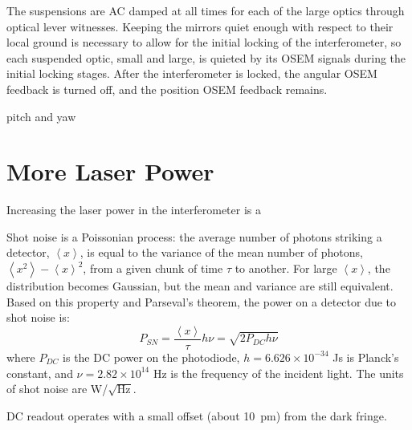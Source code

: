 The suspensions are AC damped at all times for each of the large
optics through optical lever witnesses. Keeping the mirrors quiet
enough with respect to their local ground is necessary to allow for
the initial locking of the interferometer, so each suspended optic,
small and large, is quieted by its OSEM signals during the initial
locking stages. After the interferometer is locked, the angular OSEM
feedback is turned off, and the position OSEM feedback remains.

pitch and yaw



\section{More Laser Power}
Increasing the laser power in the interferometer is a 

Shot noise is a Poissonian process: the average number of photons
striking a detector, $\left<x\right>$, is equal to the variance of the
mean number of photons, $\left<x^2\right> - \left<x\right>^2$, from a
given chunk of time $\tau$ to another. For large $\left<x\right>$, the
distribution becomes Gaussian, but the mean and variance are still
equivalent. Based on this property and Parseval's theorem, the power
on a detector due to shot noise is:
\begin{equation}
P_{SN} = \frac{\left<x\right>}{\tau} h \nu = \sqrt{2 P_{DC} h \nu}
\end{equation}
where $P_{DC}$ is the DC power on the photodiode, $h = 6.626 \times
10^{-34}$ Js is Planck's constant, and $\nu = 2.82 \times 10^{14}$ Hz
is the frequency of the incident light. The units of shot noise are
W/$\sqrt{\mathrm{Hz}}$.


DC readout operates with a small offset (about 10~pm) from the dark fringe. 

